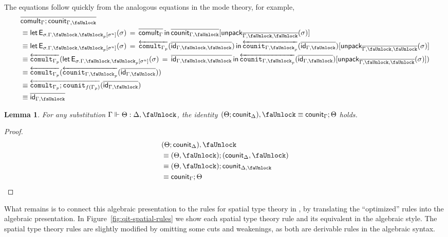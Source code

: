 \documentclass[10pt]{article}
\newtheorem{lemma}{Lemma}
\theoremstyle{definition}
\newcommand{\id}{\mathsf{id}}
\newcommand{\rewrite}[2]{\overleftarrow{#1}(#2)}
\newcommand\EEs[4]{\ensuremath{\mathsf{let} \, \mathsf{E}_{#1}(#3) \, = \, {#2} \, \mathsf{in} \, #4}}
\newcommand\unpack[2]{\ensuremath{\mathsf{unpack}_{#1}(#2)}}
\newcommand\unp[2]{\ensuremath{{#2}^u}}
\newcommand{\modeof}[1]{{#1}_p}
\newcommand{\qyields}{\Vdash}
\newcommand{\upstairs}[1]{\overline{#1}}
\newcommand{\lock}{\text{\faUnlock}}
\newcommand\fcomult[1]{\ensuremath{\mathtt{comult}_{#1}}}
\newcommand\fcounit[1]{\ensuremath{\mathtt{counit}_{#1}}}
\newcommand{\counit}[1]{\mathsf{counit}_{#1}}
\newcommand{\comult}[1]{\mathsf{comult}_{#1}}
\begin{document}
The equations follow quickly from the analogous equations in the mode theory, for example, 
\begin{align*}
&\upstairs{\comult{\Gamma} ; \counit{\Gamma, \lock}} \\
&\equiv \EEs{\sigma.\modeof{\Gamma, \lock, \lock}[\unp{\Gamma, \lock, \lock}{\sigma}]}{\upstairs{\comult{\Gamma}}}{\sigma}{\upstairs{\counit{\Gamma, \lock}}[\unpack{\upstairs{\Gamma, \lock, \lock}}{\sigma}]} \\
&\equiv \EEs{\sigma.\modeof{\Gamma, \lock, \lock}[\unp{\Gamma, \lock, \lock}{\sigma}]}{\rewrite{\fcomult{\modeof{\Gamma}}}{\upstairs{\id_{\Gamma, \lock, \lock}}}}{\sigma}{\rewrite{\fcounit{\modeof{\Gamma, \lock}}}{\upstairs{\id_{\Gamma, \lock}}}[\unpack{\upstairs{\Gamma, \lock, \lock}}{\sigma}]} \\
&\equiv \rewrite{\fcomult{\modeof{\Gamma}}}{\EEs{\sigma.\modeof{\Gamma, \lock, \lock}[\unp{\Gamma, \lock, \lock}{\sigma}]}{\upstairs{\id_{\Gamma, \lock, \lock}}}{\sigma}{\rewrite{\fcounit{\modeof{\Gamma, \lock}}}{\upstairs{\id_{\Gamma, \lock}}}[\unpack{\upstairs{\Gamma, \lock, \lock}}{\sigma}]}} \\
&\equiv \rewrite{\fcomult{\modeof{\Gamma}}}{\rewrite{\fcounit{\modeof{\Gamma, \lock}}}{\upstairs{\id_{\Gamma, \lock}}}} \\
&\equiv \rewrite{\fcomult{\modeof{\Gamma}};\fcounit{f(\modeof{\Gamma})}}{\upstairs{\id_{\Gamma, \lock}}} \\
&\equiv \upstairs{\id_{\Gamma, \lock}}
\end{align*}

\begin{lemma}
For any substitution $\Gamma \qyields \Theta : \Delta, \lock$, the identity $(\Theta ; \counit{\Delta}), \lock \equiv \counit{\Gamma} ; \Theta$ holds.
\end{lemma}
\begin{proof}
\begin{align*}
&(\Theta ; \counit{\Delta}), \lock \\
&\equiv (\Theta, \lock) ; (\counit{\Delta}, \lock) \\
&\equiv (\Theta, \lock) ; \counit{\Delta, \lock}\\
&\equiv \counit{\Gamma} ; \Theta
\end{align*}
\end{proof}

What remains is to connect this algebraic presentation to the rules for
spatial type theory in \citet{shulman15realcohesion}, by translating the
``optimized'' rules into the algebraic presentation.  In
Figure~\ref{fig:qit-spatial-rules} we show each spatial type theory rule
and its equivalent in the algebraic style.  The spatial type theory
rules are slightly modified by omitting some cuts and weakenings, as
both are derivable rules in the algebraic syntax.
\end{document}
